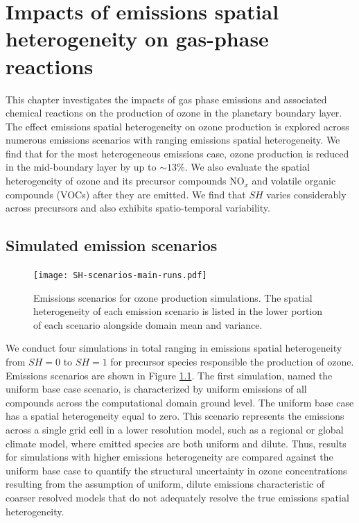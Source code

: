\chapter{Impacts of emissions spatial heterogeneity on gas-phase reactions}

This chapter investigates the impacts of gas phase emissions and associated chemical reactions on the production of ozone in the planetary boundary layer. The effect emissions spatial heterogeneity on ozone production is explored across numerous emissions scenarios with ranging emissions spatial heterogeneity. We find that for the most heterogeneous emissions case, ozone production is reduced in the mid-boundary layer by up to $\sim13\%$. We also evaluate the spatial heterogeneity of ozone and its precursor compounds NO$_x$ and volatile organic compounds (VOCs) after they are emitted. We find that $SH$ varies considerably across precursors and also exhibits spatio-temporal variability.

\section{Simulated emission scenarios}

\begin{figure}[h]
	\centering
	\texttt{[image: SH-scenarios-main-runs.pdf]}
	\caption{Emissions scenarios for ozone production simulations. The spatial heterogeneity of each emission scenario is listed in the lower portion of each scenario alongside domain mean and variance.}
	\label{fig:ozone-emission-patterns}
\end{figure}

We conduct four simulations in total ranging in emissions spatial heterogeneity from $SH=0$ to $SH=1$ for precursor species responsible the production of ozone. Emissions scenarios are shown in Figure \ref{fig:ozone-emission-patterns}. The first simulation, named the uniform base case scenario, is characterized by uniform emissions of all compounds across the computational domain ground level. The uniform base case has a spatial heterogeneity equal to zero. This scenario represents the emissions across a single grid cell in a lower resolution model, such as a regional or global climate model, where emitted species are both uniform and dilute. Thus, results for simulations with higher emissions heterogeneity are compared against the uniform base case to quantify the structural uncertainty in ozone concentrations resulting from the assumption of uniform, dilute emissions characteristic of coarser resolved models that do not adequately resolve the true emissions spatial heterogeneity.  


